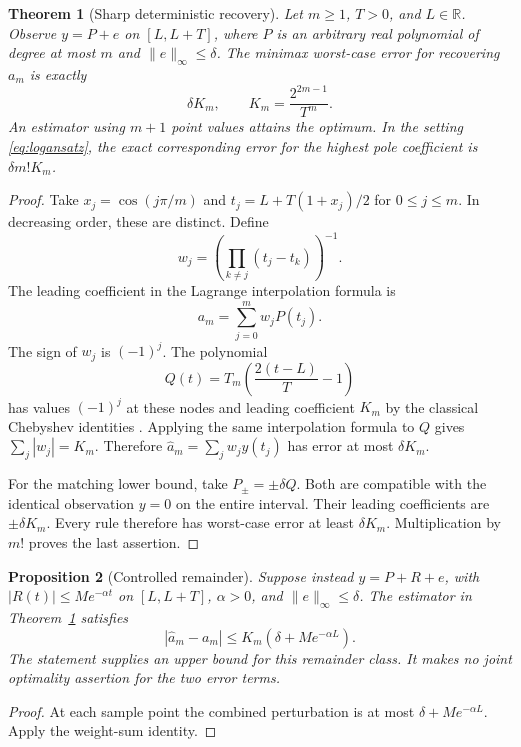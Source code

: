 \documentclass[11pt]{article}
\newtheorem{theorem}{Theorem}
\newtheorem{proposition}[theorem]{Proposition}
\theoremstyle{remark}\newtheorem{remark}[theorem]{Remark}
\begin{document}
\begin{theorem}[Sharp deterministic recovery]\label{thm:cheb}
Let $m\ge1$, $T>0$, and $L\in\mathbb R$. Observe $y=P+e$ on $[L,L+T]$, where $P$ is an arbitrary real polynomial of degree at most $m$ and $\|e\|_\infty\le\delta$. The minimax worst-case error for recovering $a_m$ is exactly
\begin{equation}\label{eq:kappa}
 \delta K_m,\qquad K_m=\frac{2^{2m-1}}{T^m}.
\end{equation}
An estimator using $m+1$ point values attains the optimum. In the setting \eqref{eq:logansatz}, the exact corresponding error for the highest pole coefficient is $\delta m!K_m$.
\end{theorem}
\begin{proof}
Take $x_j=\cos(j\pi/m)$ and $t_j=L+T(1+x_j)/2$ for $0\le j\le m$. In decreasing order, these are distinct. Define
\[
 w_j=\left(\prod_{k\ne j}(t_j-t_k)\right)^{-1}.
\]
The leading coefficient in the Lagrange interpolation formula is
\[
 a_m=\sum_{j=0}^m w_jP(t_j).
\]
The sign of $w_j$ is $(-1)^j$. The polynomial
\[
 Q(t)=T_m\left(\frac{2(t-L)}{T}-1\right)
\]
has values $(-1)^j$ at these nodes and leading coefficient $K_m$ by the classical Chebyshev identities \cite{dlmfcheb}. Applying the same interpolation formula to $Q$ gives $\sum_j|w_j|=K_m$. Therefore $\widehat a_m=\sum_jw_jy(t_j)$ has error at most $\delta K_m$.

For the matching lower bound, take $P_\pm=\pm\delta Q$. Both are compatible with the identical observation $y=0$ on the entire interval. Their leading coefficients are $\pm\delta K_m$. Every rule therefore has worst-case error at least $\delta K_m$. Multiplication by $m!$ proves the last assertion.
\end{proof}

\begin{proposition}[Controlled remainder]\label{prop:remainder}
Suppose instead $y=P+R+e$, with $|R(t)|\le Me^{-\alpha t}$ on $[L,L+T]$, $\alpha>0$, and $\|e\|_\infty\le\delta$. The estimator in Theorem~\ref{thm:cheb} satisfies
\[
 |\widehat a_m-a_m|\le K_m(\delta+Me^{-\alpha L}).
\]
The statement supplies an upper bound for this remainder class. It makes no joint optimality assertion for the two error terms.
\end{proposition}
\begin{proof}
At each sample point the combined perturbation is at most $\delta+Me^{-\alpha L}$. Apply the weight-sum identity.
\end{proof}
\end{document}
